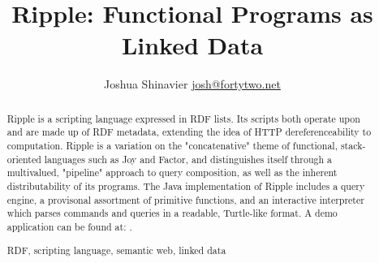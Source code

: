 \documentclass[runningheads]{llncs}
\newcommand{\keywords}[1]{\par\addvspace\baselineskip
\noindent\keywordname\enspace\ignorespaces#1}
\begin{document}
\mainmatter  %


\title{Ripple: Functional Programs as Linked Data}


%
%
\author{
Joshua Shinavier
\newline
\url{josh@fortytwo.net}}
%


%
%

\maketitle


\begin{abstract}
Ripple is a scripting language expressed in RDF lists.  Its scripts both operate upon and are made up of RDF metadata, extending the idea of HTTP dereferenceability to computation.  Ripple is a variation on the "concatenative" theme of functional, stack-oriented languages such as Joy and Factor, and distinguishes itself through a multivalued, "pipeline" approach to query composition, as well as the inherent distributability of its programs.  The Java implementation of Ripple includes a query engine, a provisonal assortment of primitive functions, and an interactive interpreter which parses commands and queries in a readable, Turtle-like format.  A demo application can be found at:
.
\keywords{RDF, scripting language, semantic web, linked data}
\end{abstract}
\end{document}
